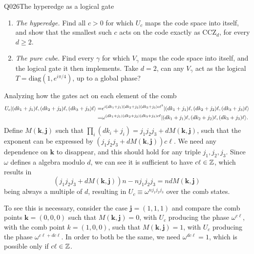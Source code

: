 \begin{entry}{Q026}{The hyperedge as a logical gate}
\begin{problem}
\begin{enumerate}[label=\textbf{(\alph*)},leftmargin=*]
  \item \emph{The hyperedge.} Find all $c>0$ for which $U_c$ maps the code space into itself, and show that the smallest such $c$ acts on the code exactly as $\mathrm{CCZ}_d$, for every $d\ge2$.
  
  \item \emph{The pure cube.}  Find every $\gamma$ for which $V_\gamma$ maps the code space into itself, and the logical gate it then implements. Take $d=2$, can any $V_\gamma$ act as the logical $T=\mathrm{diag}(1,e^{i\pi/4})$, up to a global phase?
\end{enumerate}
\end{problem}

\begin{solution}[Part (a)]
Analyzing how the gates act on each element of the comb 
\begin{equation}
\begin{split}
     U_c \lvert (d k_1+j_1)\ell , (d k_2+j_2)\ell , (d k_3+j_3)\ell  \rangle=& e^{i (d k_1+j_1) (d k_2+j_2) (d k_3+j_3) c\ell^3} \lvert (d k_1+j_1) \ell, (d k_2+j_2)\ell , (d k_3+j_3)\ell  \rangle \\
     =& \omega^{(d k_1+j_1) (d k_2+j_2) (d k_3+j_3) c\ell}  \lvert (d k_1+j_1) \ell, (d k_2+j_2)\ell , (d k_3+j_3) \ell \rangle.
\end{split}
\end{equation}
Define $M(\mathbf k, \mathbf{j})$ such that $\prod_i (dk_i +j_i)= j_1j_2j_3 + d M(\mathbf k, \mathbf{ j})$, such that the exponent can be expressed by $(j_1j_2j_3 + dM(\mathbf k, \mathbf{ j}))c \ell$. We need any dependence on $\mathbf k$ to disappear, and this should hold for any triple $j_1, j_2, j_3$. Since $\omega$ defines a algebra modulo $d$, we can see it is sufficient to have $c \ell \in \mathbb{Z}$, which results in 
$$(j_1j_2j_3 + dM(\mathbf k, \mathbf{ j}))n - nj_1j_2j_3 = n dM(\mathbf k, \mathbf{ j})$$ being always a multiple of $d$, resulting in 
$U_c \equiv \omega^{n j_1j_2j_3}$ over the comb states. 

To see this is necessary, consider the case $\mathbf j = (1,1,1)$ and compare the comb points $\mathbf k = (0,0,0)$ such that $M(\mathbf k, \mathbf{ j})=0$, with $U_c$ producing the phase $\omega^{c\ell}$, with the comb point $k=(1,0,0)$, such that $M(\mathbf k, \mathbf{ j})=1$, with $U_c$ producing the phase $\omega^{c\ell + dc\ell}$. In order to both be the same, we need $\omega^{dc\ell}=1$, which is possible only if $c \ell \in \mathbb{Z}$.


\end{solution}
\end{entry}
